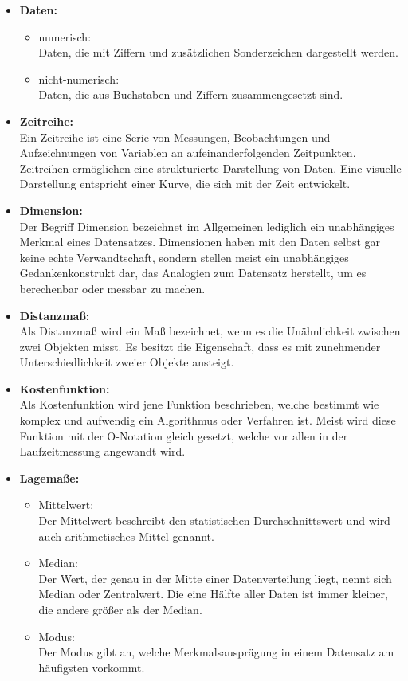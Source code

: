 \begin{itemize}
\item \textbf{Daten:}
	\begin{itemize}
		\item numerisch:\\Daten, die  mit Ziffern und zusätzlichen Sonderzeichen dargestellt werden.
		\item nicht-numerisch:\\Daten, die aus Buchstaben und Ziffern zusammengesetzt sind.
	\end{itemize}
	\item \textbf{Zeitreihe:}\\Ein Zeitreihe ist eine Serie von Messungen, Beobachtungen und Aufzeichnungen von Variablen an aufeinanderfolgenden Zeitpunkten. Zeitreihen ermöglichen eine strukturierte Darstellung von Daten. Eine visuelle Darstellung entspricht einer Kurve, die sich mit der Zeit entwickelt.
	\item \textbf{Dimension:}\\  Der Begriff Dimension bezeichnet im Allgemeinen lediglich ein unabhängiges Merkmal eines Datensatzes. Dimensionen haben mit den Daten selbst gar keine echte Verwandtschaft, sondern stellen meist ein unabhängiges Gedankenkonstrukt dar, das Analogien zum Datensatz herstellt, um es berechenbar oder messbar zu machen.
\item \textbf{Distanzmaß:}\\ Als Distanzmaß wird ein Maß bezeichnet, wenn es die Unähnlichkeit zwischen zwei Objekten misst. Es besitzt die Eigenschaft, dass es mit zunehmender Unterschiedlichkeit zweier Objekte ansteigt.
\item \textbf{Kostenfunktion:}\\ Als Kostenfunktion wird jene Funktion beschrieben, welche bestimmt wie komplex und aufwendig ein Algorithmus oder Verfahren ist. Meist wird diese Funktion mit der O-Notation gleich gesetzt, welche vor allen in der Laufzeitmessung angewandt wird.
\item \textbf{Lagemaße:}
	\begin{itemize}
		\item Mittelwert:\\ Der Mittelwert beschreibt den statistischen Durchschnittswert und wird auch arithmetisches Mittel genannt. 
		\item Median:\\Der Wert, der genau in der Mitte einer Datenverteilung liegt, nennt sich Median oder Zentralwert. Die eine Hälfte aller Daten ist immer kleiner, die andere größer als der Median. 
		\item Modus:\\Der Modus gibt an, welche Merkmalsausprägung in einem Datensatz am häufigsten vorkommt. 

\end{itemize}
\end{itemize}
